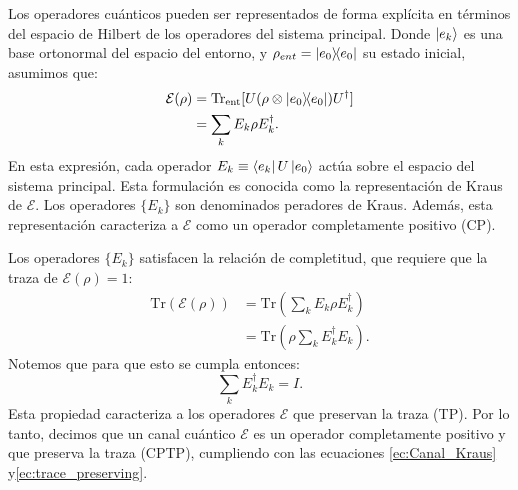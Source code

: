 \documentclass[letterpaper,12pt]{thesisECFM}
\theoremstyle{plain}
\theoremstyle{definition}
\theoremstyle{definition}
\theoremstyle{remark}
\newcommand{\1}{\mathbb{1}}
\begin{document}
Los operadores cuánticos pueden ser representados de forma explícita en términos del espacio de Hilbert de los operadores del sistema principal. Donde $\ket{e_k}$ es una base ortonormal del espacio del entorno, y $\rho_{ent} = \ketbra{e_0}$ su estado inicial, asumimos que:
\begin{align}
\mathcal{E}(\rho) &= \text{Tr}_{\text{ent}}[ U( \rho \otimes \ketbra{e_0} ) U^\dagger ] \\
&= \sum_k E_k \rho E_k^\dagger.  \label{ec:Canal_Kraus}
\end{align}
En esta expresión, cada operador $E_k \equiv \bra{e_k} U \ket{e_0}$ actúa sobre el espacio del sistema principal. Esta formulación es conocida como la representación de Kraus de $\mathcal{E}$. Los operadores $\{E_k\}$ son denominados peradores de Kraus. Además, esta representación caracteriza a $\mathcal{E}$ como un operador completamente positivo (CP).

Los operadores $\{E_k\}$  satisfacen la relación de completitud, que requiere que la traza de $\mathcal{E}(\rho) = 1$:
\begin{align}
    \text{Tr}(\mathcal{E}(\rho)) &= \text{Tr}\left(\sum_k E_k \rho E_k^\dagger\right) \\
    &= \text{Tr}\left(\rho \sum_k E_k^\dagger E_k \right).
\end{align}
Notemos que para que esto se cumpla entonces:
\begin{equation}
    \sum_k E_k^\dagger E_k = I. \label{ec:trace_preserving}
\end{equation}
Esta propiedad caracteriza a los operadores $\mathcal{E}$ que preservan la traza (TP). Por lo tanto, decimos que un canal cuántico $\mathcal{E}$ es un operador completamente positivo y  que preserva la traza (CPTP), cumpliendo con las ecuaciones \ref{ec:Canal_Kraus}  y\ref{ec:trace_preserving}. 
\end{document}
